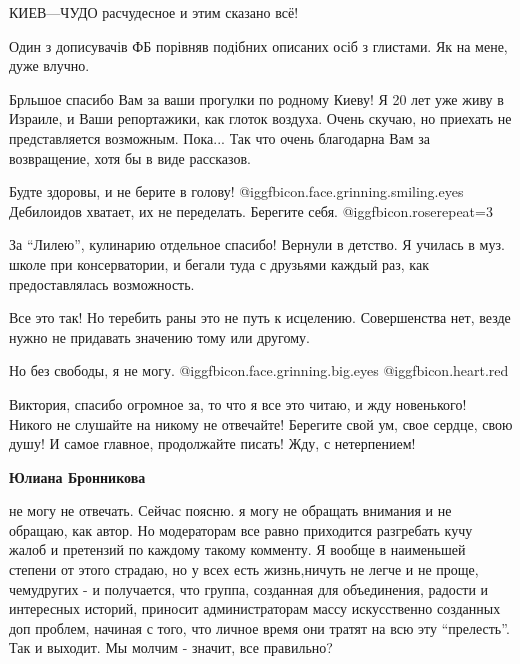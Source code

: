 \begin{itemize}
\begin{itemize}
\end{itemize} %

КИЕВ—ЧУДО расчудесное и этим сказано всё!

Один з дописувачів ФБ порівняв подібних описаних осіб з глистами. Як на мене, дуже влучно.


Брльшое спасибо Вам за ваши прогулки по родному Киеву! Я 20 лет уже живу в
Израиле, и Ваши репортажики, как глоток воздуха. Очень скучаю, но приехать не
представляется возможным. Пока... Так что очень благодарна Вам за возвращение,
хотя бы в виде рассказов.

Будте здоровы, и не берите в голову! @igg{fbicon.face.grinning.smiling.eyes}
Дебилоидов хватает, их не переделать. Берегите себя.
@igg{fbicon.rose}{repeat=3} 

За \enquote{Лилею}, кулинарию отдельное спасибо! Вернули в детство. Я училась в муз.
школе при консерватории, и бегали туда с друзьями каждый раз, как
предоставлялась возможность.


Все это так! Но теребить раны это не путь к исцелению.
Совершенства нет, везде нужно не придавать значению тому или другому.

Но без свободы, я не могу. @igg{fbicon.face.grinning.big.eyes} 	@igg{fbicon.heart.red}


Виктория, спасибо огромное за, то что я все это читаю, и жду новенького! Никого
не слушайте на никому не отвечайте! Берегите свой ум, свое сердце, свою душу! И
самое главное, продолжайте писать! Жду, с нетерпением!

\begin{itemize} %
\textbf{Юлиана Бронникова} 

не могу не отвечать. Сейчас поясню. я могу не обращать внимания и не обращаю,
как автор. Но модераторам все равно приходится разгребать кучу жалоб и
претензий по каждому такому комменту. Я вообще в наименьшей степени от этого
страдаю, но у всех есть жизнь,ничуть не легче и не проще, чемудругих - и
получается, что группа, созданная для объединения, радости и интересных
историй, приносит администраторам массу искусственно созданных доп проблем,
начиная с того, что личное время они тратят на всю эту \enquote{прелесть}. Так и
выходит. Мы молчим - значит, все правильно?

\end{itemize} %


\end{itemize}
